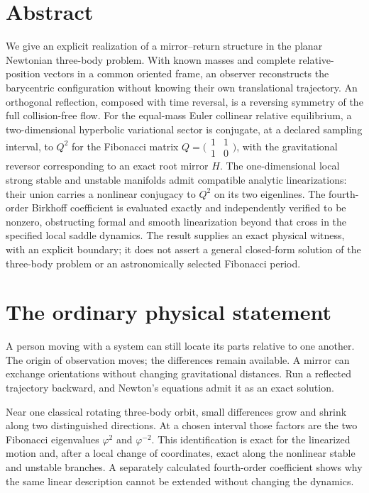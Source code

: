 \documentclass[11pt,letterpaper]{article}
\theoremstyle{paper}
\begin{document}
\hypersetup{pageanchor=true}

\section*{Abstract}
We give an explicit realization of a mirror--return structure in the planar Newtonian three-body problem. With known masses and complete relative-position vectors in a common oriented frame, an observer reconstructs the barycentric configuration without knowing their own translational trajectory. An orthogonal reflection, composed with time reversal, is a reversing symmetry of the full collision-free flow. For the equal-mass Euler collinear relative equilibrium, a two-dimensional hyperbolic variational sector is conjugate, at a declared sampling interval, to $Q^2$ for the Fibonacci matrix $Q=\bigl(\begin{smallmatrix}1&1\\1&0\end{smallmatrix}\bigr)$, with the gravitational reversor corresponding to an exact root mirror $H$. The one-dimensional local strong stable and unstable manifolds admit compatible analytic linearizations: their union carries a nonlinear conjugacy to $Q^2$ on its two eigenlines. The fourth-order Birkhoff coefficient is evaluated exactly and independently verified to be nonzero, obstructing formal and smooth linearization beyond that cross in the specified local saddle dynamics. The result supplies an exact physical witness, with an explicit boundary; it does not assert a general closed-form solution of the three-body problem or an astronomically selected Fibonacci period.

\section{The ordinary physical statement}

A person moving with a system can still locate its parts relative to one another. The origin of observation moves; the differences remain available. A mirror can exchange orientations without changing gravitational distances. Run a reflected trajectory backward, and Newton's equations admit it as an exact solution.

Near one classical rotating three-body orbit, small differences grow and shrink along two distinguished directions. At a chosen interval those factors are the two Fibonacci eigenvalues $\varphi^2$ and $\varphi^{-2}$. This identification is exact for the linearized motion and, after a local change of coordinates, exact along the nonlinear stable and unstable branches. A separately calculated fourth-order coefficient shows why the same linear description cannot be extended without changing the dynamics.
\end{document}
